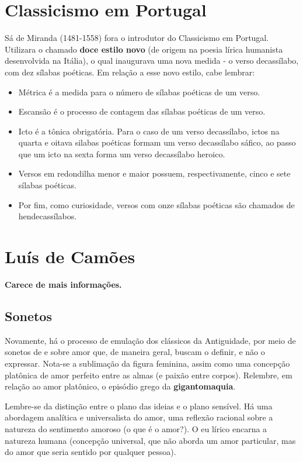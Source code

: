 \documentclass[12pt]{book}
\begin{document}
 		\chapter{Classicismo em Portugal}
 		\par Sá de Miranda (1481-1558) fora o introdutor do Classicismo em Portugal. Utilizara o chamado \textbf{doce estilo novo} (de origem na poesia lírica humanista desenvolvida na Itália), o qual inaugurava uma nova medida - o verso decassílabo, com dez sílabas poéticas. Em relação a esse novo estilo, cabe lembrar:
 		\begin{itemize}
 			\item Métrica é a medida para o número de sílabas poéticas de um verso.
 			\item Escansão é o processo de contagem das sílabas poéticas de um verso.
 			\item Icto é a tônica obrigatória. Para o caso de um verso decassílabo, ictos na quarta e oitava silabas poéticas formam um verso decassílabo sáfico, ao passo que um icto na sexta forma um verso decassílabo heroico.
 			\item Versos em redondilha menor e maior possuem, respectivamente, cinco e sete sílabas poéticas.
 			\item Por fim, como curiosidade, versos com onze sílabas poéticas são chamados de hendecassílabos.
 		\end{itemize}
 	
 		\chapter{Luís de Camões}
 		\par \textbf{Carece de mais informações.}
 			\section{Sonetos}
 			\par Novamente, há o processo de emulação dos clássicos da Antiguidade, por meio de sonetos de e sobre amor que, de maneira geral, buscam o definir, e não o expressar. Nota-se a sublimação da figura feminina, assim como uma concepção platônica de amor perfeito entre as almas (e paixão entre corpos). Relembre, em relação ao amor platônico, o episódio grego da \textbf{gigantomaquia}.
 			\par Lembre-se da distinção entre o plano das ideias e o plano sensível. Há uma abordagem analítica e universalista do amor, uma reflexão racional sobre a natureza do sentimento amoroso (o que é o amor?). O eu lírico encarna a natureza humana (concepção universal, que não aborda um amor particular, mas do amor que seria sentido por qualquer pessoa).
\end{document}
